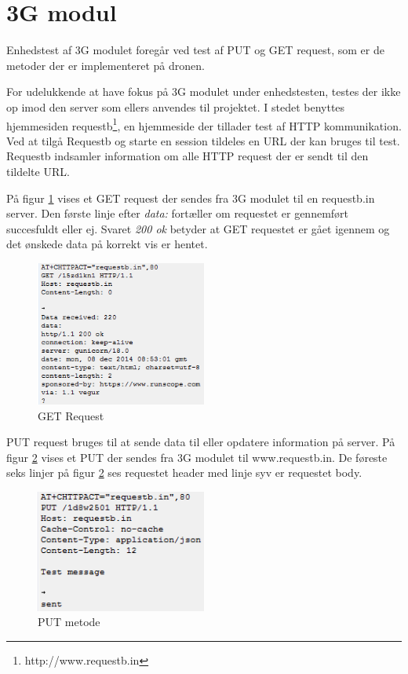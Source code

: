 \section{3G modul}

Enhedstest af 3G modulet foregår ved test af PUT og GET request, som er de metoder der er implementeret på dronen.

For udelukkende at have fokus på 3G modulet under enhedstesten, testes der ikke op imod den server som ellers anvendes til projektet. I stedet benyttes hjemmesiden requestb\footnote{http://www.requestb.in}, en hjemmeside der tillader test af HTTP kommunikation. Ved at tilgå Requestb og starte en session tildeles en URL der kan bruges til test. Requestb indsamler information om alle HTTP request der er sendt til den tildelte URL. 

På figur \ref{fig:get_req} vises et GET request der sendes fra 3G modulet til en requestb.in server. Den første linje efter \textit{data:} fortæller om requestet er gennemført succesfuldt eller ej. Svaret \textit{200 ok} betyder at GET requestet er gået igennem og det ønskede data på korrekt vis er hentet. 

\vspace{0.3cm}

\begin{figure}[H]
\centering
\includegraphics[width=0.5\textwidth]{Billeder/Test/get_requestbin.png}
\caption{GET Request}
\label{fig:get_req}
\end{figure}

\newpage

PUT request bruges til at sende data til eller opdatere information på server. 
På figur \ref{fig:putrequest_module} vises et PUT der sendes fra 3G modulet til www.requestb.in. De føreste seks linjer på figur \ref{fig:putrequest_module} ses requestet header med linje syv er requestet body. 

\begin{figure}[H]
\centering
\includegraphics[width=0.5\textwidth]{Billeder/Test/putrequest_module.png}
\caption{PUT metode}
\label{fig:putrequest_module}
\end{figure}

